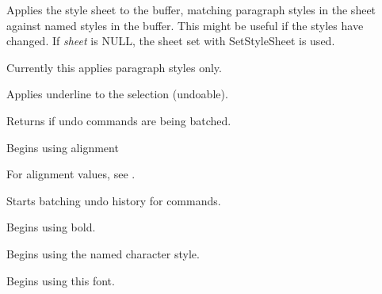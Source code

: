 Applies the style sheet to the buffer, matching paragraph styles in the sheet against named styles
in the buffer. This might be useful if the styles have changed. If {\it sheet} is NULL, the
sheet set with SetStyleSheet is used.

Currently this applies paragraph styles only.

\label{wxrichtextctrlapplyunderlinetoselection}


Applies underline to the selection (undoable).

\label{wxrichtextctrlbatchingundo}


Returns \true if undo commands are being batched.

\label{wxrichtextctrlbeginalignment}


Begins using alignment

For alignment values, see .

\label{wxrichtextctrlbeginbatchundo}


Starts batching undo history for commands.

\label{wxrichtextctrlbeginbold}


Begins using bold.

\label{wxrichtextctrlbegincharacterstyle}


Begins using the named character style.

\label{wxrichtextctrlbeginfont}


Begins using this font.

\label{wxrichtextctrlbeginfontsize}

